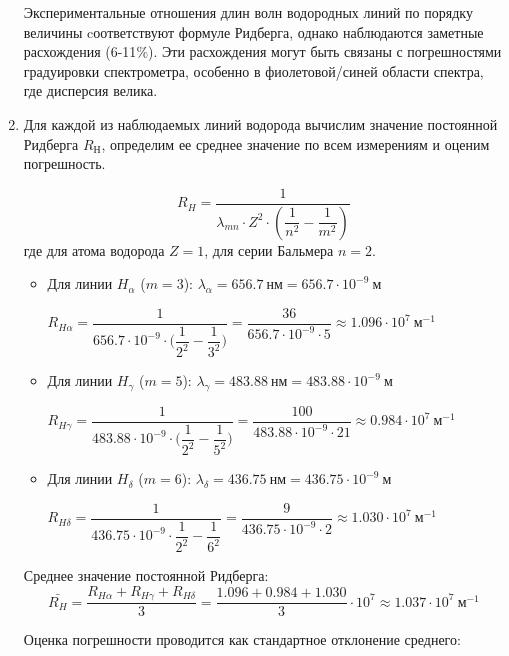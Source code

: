 \documentclass[a4paper,12pt]{article}
\begin{document}
\begin{enumerate}
    Экспериментальные отношения длин волн водородных линий по порядку величины cоответствуют формуле Ридберга, однако наблюдаются заметные расхождения (6-11$\%$). Эти расхождения могут быть связаны с погрешностями градуировки спектрометра, особенно в фиолетовой/синей области спектра, где дисперсия велика.

    \item Для каждой из наблюдаемых линий водорода вычислим значение постоянной Ридберга $R_\text{Н}$, определим ее среднее значение по всем измерениям и оценим погрешность.

    $$
    R_H = \frac{1}{\lambda_{mn} \cdot Z^2 \cdot \left( \dfrac{1}{n^2} - \dfrac{1}{m^2} \right)}
    $$
    где для атома водорода $Z = 1$, для серии Бальмера $n = 2$.
    
    \begin{itemize}
        \item Для линии $H_\alpha$ ($m = 3$):
        $\lambda_\alpha = 656.7\ \text{нм} = 656.7 \cdot 10^{-9}\ \text{м}$
        
        $R_{H\alpha} = \dfrac{1}{656.7 \cdot 10^{-9} \cdot \Big(\dfrac{1}{2^2} - \dfrac{1}{3^2}\Big)} = \dfrac{36}{656.7 \cdot 10^{-9} \cdot 5} \approx 1.096 \cdot 10^7\ \text{м}^{-1}$
    
        \item Для линии $H_\gamma$ ($m = 5$):
        $\lambda_\gamma = 483.88\ \text{нм} = 483.88 \cdot 10^{-9}\ \text{м}$
        
        $R_{H\gamma} = \dfrac{1}{483.88 \cdot 10^{-9} \cdot \Big(\dfrac{1}{2^2} - \dfrac{1}{5^2}\Big)} = \dfrac{100}{483.88 \cdot 10^{-9} \cdot 21} \approx 0.984 \cdot 10^7\ \text{м}^{-1}$

        \item Для линии $H_\delta$ ($m = 6$):
        $\lambda_\delta = 436.75\ \text{нм} = 436.75 \cdot 10^{-9}\ \text{м}$

        $R_{H\delta} = \dfrac{1}{436.75 \cdot 10^{-9} \cdot \dfrac{1}{2^2} - \dfrac{1}{6^2}} = \dfrac{9}{436.75 \cdot 10^{-9} \cdot 2} \approx 1.030 \cdot 10^7\ \text{м}^{-1}$    
    \end{itemize}
    
    Среднее значение постоянной Ридберга:
    $$
    \bar{R_H} = \frac{R_{H\alpha} + R_{H\gamma} + R_{H\delta}}{3} = \frac{1.096 + 0.984 + 1.030}{3} \cdot 10^7 \approx 1.037 \cdot 10^7\ \text{м}^{-1}
    $$
    
    Оценка погрешности проводится как стандартное отклонение среднего:


\end{enumerate}
\end{document}
